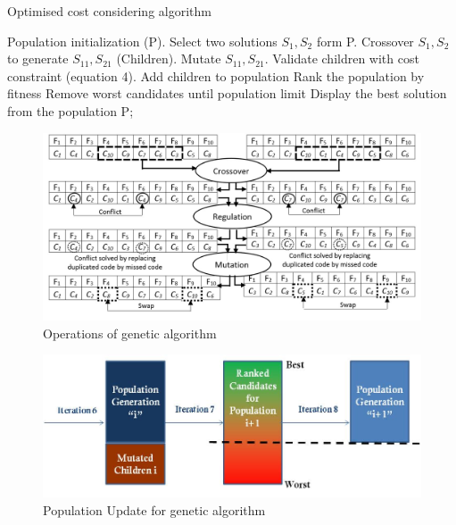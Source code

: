 \documentclass[preprint,12pt]{elsarticle}
\begin{document}
\begin{algorithm}[t]
\caption{Optimised cost considering algorithm}
\begin{algorithmic}[1]
\State Population initialization (P).
\REPEAT  
\State Select two solutions $S_{1},S_{2}$ form P.
\State Crossover $S_{1},S_{2}$ to generate $S_{11},S_{21}$ (Children).
\State Mutate $S_{11},S_{21}$.
\State Validate children with cost constraint (equation 4). 
\State Add children to population
\State Rank the population by fitness
\State Remove worst candidates until population limit
\EndWhile
\State Display the best solution from the population P;
\end{algorithmic}
\end{algorithm}

\begin{figure}[h]
\begin{center}
\includegraphics[scale=0.5]{Images/Drawing2.jpg}
\caption{Operations of genetic algorithm}
\end{center}
\label{Fig3}
\end{figure}

\begin{figure}[!thpb]
\begin{center}
\includegraphics[scale=0.7]{Images/Drawing1.jpg}
\caption{Population Update for genetic algorithm}
\end{center}
\label{Fig2}
\end{figure}
\end{document}
